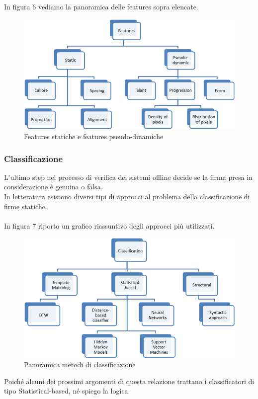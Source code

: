 In figura 6 vediamo la panoramica delle features sopra elencate.
\begin{figure}[H]
\centering
\includegraphics[scale=0.7]{../Logo&Header/featuresStaticPseudoD.png}
\caption{Features statiche e features pseudo-dinamiche}
\end{figure}
\subsubsection*{Classificazione}
\label{2.1.3.2}
L'ultimo step nel processo di verifica dei sistemi offline decide se la firma presa in considerazione è genuina o falsa.\\
In letteratura esistono diversi tipi di approcci al problema della classificazione di firme statiche.\\\\
In figura 7 riporto un grafico riassuntivo degli approcci più utilizzati.
\begin{figure}[h!]
\centering
\includegraphics[scale=0.7]{../Logo&Header/classificatori.png}
\caption{Panoramica metodi di classificazione}
\end{figure}
Poiché alcuni dei prossimi argomenti di questa relazione trattano i classificatori di tipo Statistical-based, né spiego la logica.
